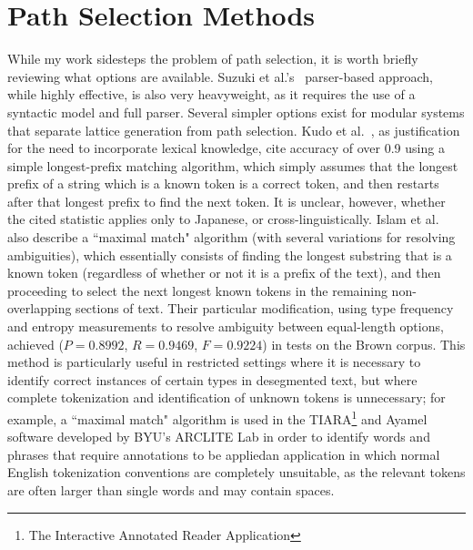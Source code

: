 \section{Path Selection Methods}
While my work sidesteps the problem of path selection, it is worth briefly reviewing what options are available. Suzuki et al.'s~\cite{suzuki00} parser-based approach, while highly effective, is also very heavyweight, as it requires the use of a syntactic model and full parser. Several simpler options exist for modular systems that separate lattice generation from path selection. Kudo et al.~\cite{kudo04}, as justification for the need to incorporate lexical knowledge, cite accuracy of over 0.9 using a simple longest-prefix matching algorithm, which simply assumes that the longest prefix of a string which is a known token is a correct token, and then restarts after that longest prefix to find the next token. It is unclear, however, whether the cited statistic applies only to Japanese, or cross-linguistically. Islam et al.~\cite{islam07} also describe a ``maximal match" algorithm (with several variations for resolving ambiguities), which essentially consists of finding the longest substring that is a known token (regardless of whether or not it is a prefix of the text), and then proceeding to select the next longest known tokens in the remaining non-overlapping sections of text. Their particular modification, using type frequency and entropy measurements to resolve ambiguity between equal-length options, achieved ($P = 0.8992$, $R = 0.9469$, $F = 0.9224$) in tests on the Brown corpus. This method is particularly useful in restricted settings where it is necessary to identify correct instances of certain types in desegmented text, but where complete tokenization and identification of unknown tokens is unnecessary; for example, a ``maximal match" algorithm is used in the TIARA\footnote{The Interactive Annotated Reader Application} \cite{cloe12} and Ayamel \cite{todd14} software developed by BYU's ARCLITE Lab in order to identify words and phrases that require annotations to be applied\textemdash an application in which normal English tokenization conventions are completely unsuitable, as the relevant tokens are often larger than single words and may contain spaces.
